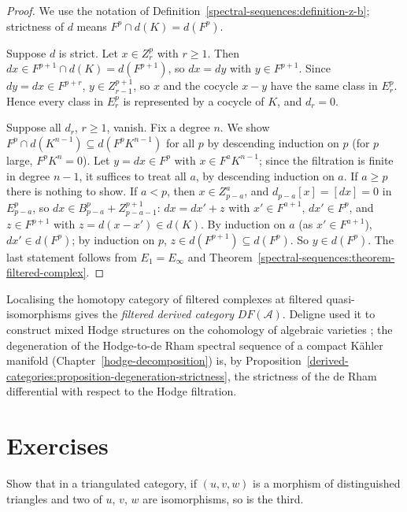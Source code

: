 \begin{proof}
We use the notation of Definition~\ref{spectral-sequences:definition-z-b}; strictness of $d$ means $F^p \cap d(K) = d(F^p)$.

Suppose $d$ is strict. Let $x \in Z_r^p$ with $r \geq 1$. Then $dx \in F^{p+1} \cap d(K) = d(F^{p+1})$, so $dx = dy$ with $y \in F^{p+1}$. Since
$dy = dx \in F^{p+r}$, $y \in Z_{r-1}^{p+1}$, so $x$ and the cocycle $x - y$ have the same class in $E_r^p$. Hence every class in $E_r^p$ is represented by
a cocycle of $K$, and $d_r = 0$.

Suppose all $d_r$, $r \geq 1$, vanish. Fix a degree $n$. We show $F^p \cap d(K^{n-1}) \subseteq d(F^pK^{n-1})$ for all $p$ by descending
induction on $p$ (for $p$ large, $F^pK^n = 0$). Let $y = dx \in F^p$ with $x \in F^aK^{n-1}$; since the filtration is finite in degree $n - 1$, it suffices
to treat all $a$, by descending induction on $a$. If $a \geq p$ there is nothing to show. If $a < p$, then
$x \in Z_{p-a}^a$, and $d_{p-a}[x] = [dx] = 0$ in $E_{p-a}^p$, so $dx \in B_{p-a}^p + Z_{p-a-1}^{p+1}$: $dx = dx' + z$ with $x' \in F^{a+1}$, $dx' \in F^p$,
and $z \in F^{p+1}$ with $z = d(x - x') \in d(K)$. By induction on $a$ (as $x' \in F^{a+1}$), $dx' \in d(F^p)$; by induction on $p$, $z \in d(F^{p+1}) \subseteq d(F^p)$. So
$y \in d(F^p)$. The last statement follows from $E_1 = E_\infty$ and Theorem~\ref{spectral-sequences:theorem-filtered-complex}.
\end{proof}

\begin{remark}\label{derived-categories:remark-filtered-derived}
Localising the homotopy category of filtered complexes at filtered quasi-isomorphisms gives the \emph{filtered derived category} $DF(\mathcal{A})$.
Deligne used it to construct mixed Hodge structures on the cohomology of algebraic varieties \cite{deligne-hodge-2}; the degeneration of the
Hodge-to-de Rham spectral sequence of a compact K\"ahler manifold (Chapter~\ref{hodge-decomposition}) is, by
Proposition~\ref{derived-categories:proposition-degeneration-strictness}, the strictness of the de Rham differential with respect to the
Hodge filtration.
\end{remark}

\section{Exercises}\label{derived-categories:section-exercises}

\begin{exercise}\label{derived-categories:exercise-five-lemma-triangles}
Show that in a triangulated category, if $(u, v, w)$ is a morphism of distinguished triangles and two of $u$, $v$, $w$ are isomorphisms, so is the
third.
\end{exercise}

